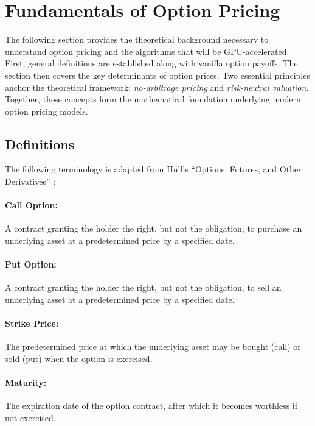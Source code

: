 \documentclass[english,12pt,a4paper,pdftex,sci,utf8]{aaltothesis}
\begin{document}
\clearpage

\section{Fundamentals of Option Pricing} \label{sec:theory}

The following section provides the theoretical background necessary to understand option pricing and the algorithms that will be GPU-accelerated. First, general definitions are established along with vanilla option payoffs. The section then covers the key determinants of option prices. Two essential principles anchor the theoretical framework: \emph{no-arbitrage pricing} and \emph{risk-neutral valuation}. Together, these concepts form the mathematical foundation underlying modern option pricing models.

\subsection{Definitions}\label{subsec:definitions}
The following terminology is adapted from Hull's ``Options, Futures, and Other Derivatives'' \cite{hull2016options}:

\paragraph{Call Option:} A contract granting the holder the right, but not the obligation, to purchase an underlying asset at a predetermined price by a specified date.

\paragraph{Put Option:} A contract granting the holder the right, but not the obligation, to sell an underlying asset at a predetermined price by a specified date.

\paragraph{Strike Price:} The predetermined price at which the underlying asset may be bought (call) or sold (put) when the option is exercised.

\paragraph{Maturity:} The expiration date of the option contract, after which it becomes worthless if not exercised.
\bigskip
\end{document}
